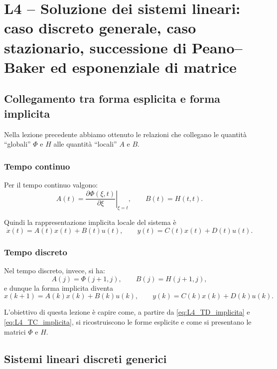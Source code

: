 \chapter{L4 -- Soluzione dei sistemi lineari: caso discreto generale, caso stazionario, successione di Peano--Baker ed esponenziale di matrice}

\section{Collegamento tra forma esplicita e forma implicita}

Nella lezione precedente abbiamo ottenuto le relazioni che collegano le quantità ``globali'' $\Phi$ e $H$ alle quantità ``locali'' $A$ e $B$.

\subsection{Tempo continuo}

Per il tempo continuo valgono:
\begin{equation}
A(t)=\left.\frac{\partial \Phi(\xi,t)}{\partial \xi}\right|_{\xi=t},
\qquad
B(t)=H(t,t).
\label{eq:L4_def_A_B_TC}
\end{equation}

Quindi la rappresentazione implicita locale del sistema è
\begin{equation}
\dot x(t)=A(t)x(t)+B(t)u(t),
\qquad
y(t)=C(t)x(t)+D(t)u(t).
\label{eq:L4_TC_implicita}
\end{equation}

\subsection{Tempo discreto}

Nel tempo discreto, invece, si ha:
\begin{equation}
A(j)=\Phi(j+1,j),
\qquad
B(j)=H(j+1,j),
\label{eq:L4_def_A_B_TD}
\end{equation}
e dunque la forma implicita diventa
\begin{equation}
x(k+1)=A(k)x(k)+B(k)u(k),
\qquad
y(k)=C(k)x(k)+D(k)u(k).
\label{eq:L4_TD_implicita}
\end{equation}

L'obiettivo di questa lezione è capire come, a partire da \eqref{eq:L4_TD_implicita} e \eqref{eq:L4_TC_implicita}, si ricostruiscono le forme esplicite e come si presentano le matrici $\Phi$ e $H$.

\section{Sistemi lineari discreti generici}

